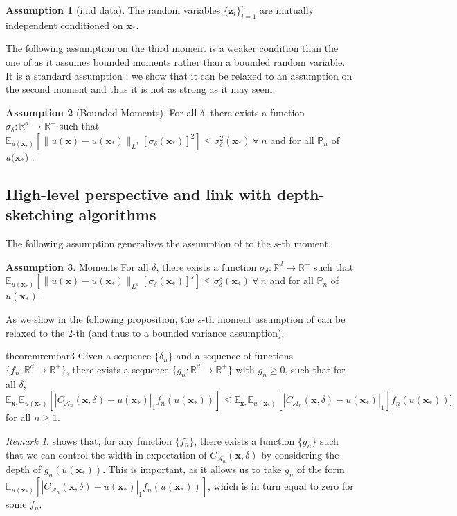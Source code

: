 \documentclass{article} %
\theoremstyle{remark}
\newtheorem{remark}{Remark}[section]
\theoremstyle{definition}      %
\newtheorem{assumption}{Assumption}[section]  %
\begin{document}
\begin{assumption}[i.i.d data] \label{ass:iid}
  The random variables $\{ \bm{z}_i \}_{i=1}^n$  are mutually independent conditioned on $\bm{x}_*$.
\end{assumption}
The following assumption on the third moment is a weaker condition than the one of \cite{angelopoulos2024conformal} as it assumes bounded moments rather than a bounded random variable. It is a standard assumption \cite[Sec. 2]{angelopoulos2024conformal}; we show that it can be relaxed to an assumption on the second moment and thus it is not as strong as it may seem.
\begin{assumption}[Bounded Moments] \label{ass:bounded}
    For all $\delta$, there exists a function $\sigma_{\delta}: \mathbb{R}^d \to \mathbb{R}^+$ such that $\mathbb{E}_{u(\bm{x_*})}[\|u(\bm{x}) - u(\bm{x_*})\|_{L^2}[\sigma_\delta(\bm{x_*})]^2] \leq \sigma_\delta^2(\bm{x_*}) ~\forall ~n$ and for all $\mathbb{P}_n$ of $u(\bm{x_*)}$ . 
  \end{assumption}
\subsection{High-level perspective and link with depth-sketching algorithms}
The following assumption generalizes the assumption of \cite{angelopoulos2024conformal} to the $s$-th moment. 
\begin{assumption}{Moments} \label{ass:mom}
  For all $\delta$, there exists a function $\sigma_{\delta}: \mathbb{R}^d \to \mathbb{R}^+$ such that $\mathbb{E}_{u(\bm{x_*})}[\|u(\bm{x}) - u(\bm{x_*})\|_{L^s}[\sigma_\delta(\bm{x_*})]^s] \leq \sigma_\delta^s(\bm{x_*}) ~\forall ~n$  and for all $\mathbb{P}_n$ of $u(\bm{x_*})$.
\end{assumption}
As we show in the following proposition, the $s$-th moment assumption of  can be relaxed to the $2$-th (and thus to a bounded variance assumption).
\begin{restatable}{theorem}{rembar3}\label{prop:rem3}
  Given a sequence $\{\delta_n\}$ and a sequence of functions $\{f_n: \mathbb{R}^d \rightarrow \mathbb{R}^+\}$, there exists a sequence $\{g_n: \mathbb{R}^d \rightarrow \mathbb{R}^+\}$ with $g_n \geq 0$, such that for all $\delta$,
  \begin{equation}
    \mathbb{E}_{\bm{x}_*} \mathbb{E}_{u(\bm{x_*})}[|C_{\mathcal{A}_n}(\bm{x},\delta) - u(\bm{x_*})|_1 f_n(u(\bm{x_*}))] \leq \mathbb{E}_{\bm{x}_*} \mathbb{E}_{u(\bm{x_*})}[|C_{\mathcal{A}_n}(\bm{x},\delta) - u(\bm{x_*})|_1] f_n(u(\bm{x_*}))] 
  \end{equation} 
  for all $n \geq 1$. 
\end{restatable}
\begin{remark}
   shows that, for any function $\{f_n\}$, there exists a function $\{g_n\}$ such that we can control the width in expectation of $C_{\mathcal{A}_n}(\bm{x},\delta)$ by considering the depth of $g_n(u(\bm{x}_*))$. This is important, as it allows us to take $g_n$ of the form $\mathbb{E}_{u(\bm{x}_*)}[|C_{\mathcal{A}_n}(\bm{x},\delta) - u(\bm{x_*})|_1 f_n(u(\bm{x_*}))]$, which is in turn equal to zero for some $f_n$. 
\end{remark}
\end{document}
